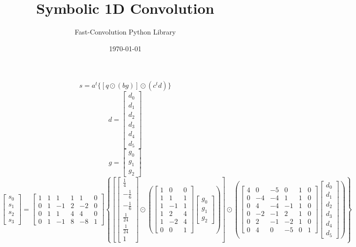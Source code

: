 \documentclass{article}%
\title{Symbolic 1D Convolution}%
\author{Fast{-}Convolution Python Library}%
\date{\today}%
\begin{document}
%
\normalsize%
\maketitle%
\[%
s = a^t \{[q \odot (bg)] \odot (c^t d)\}%
\]%
\[%
d = \left[\begin{matrix}d_{0}\\d_{1}\\d_{2}\\d_{3}\\d_{4}\\d_{5}\end{matrix}\right]%
\]%
\[%
g = \left[\begin{matrix}g_{0}\\g_{1}\\g_{2}\end{matrix}\right]%
\]%
\[%
\left[\begin{matrix}s_{0}\\s_{1}\\s_{2}\\s_{3}\end{matrix}\right] = \left[\begin{matrix}1 & 1 & 1 & 1 & 1 & 0\\0 & 1 & -1 & 2 & -2 & 0\\0 & 1 & 1 & 4 & 4 & 0\\0 & 1 & -1 & 8 & -8 & 1\end{matrix}\right] \left\{ \left[ \left[\begin{matrix}\frac{1}{4}\\- \frac{1}{6}\\- \frac{1}{6}\\\frac{1}{24}\\\frac{1}{24}\\1\end{matrix}\right] \odot \left( \left[\begin{matrix}1 & 0 & 0\\1 & 1 & 1\\1 & -1 & 1\\1 & 2 & 4\\1 & -2 & 4\\0 & 0 & 1\end{matrix}\right] \left[\begin{matrix}g_{0}\\g_{1}\\g_{2}\end{matrix}\right] \right) \right] \odot \left( \left[\begin{matrix}4 & 0 & -5 & 0 & 1 & 0\\0 & -4 & -4 & 1 & 1 & 0\\0 & 4 & -4 & -1 & 1 & 0\\0 & -2 & -1 & 2 & 1 & 0\\0 & 2 & -1 & -2 & 1 & 0\\0 & 4 & 0 & -5 & 0 & 1\end{matrix}\right] \left[\begin{matrix}d_{0}\\d_{1}\\d_{2}\\d_{3}\\d_{4}\\d_{5}\end{matrix}\right] \right) \right\}%
\]%
\end{document}
